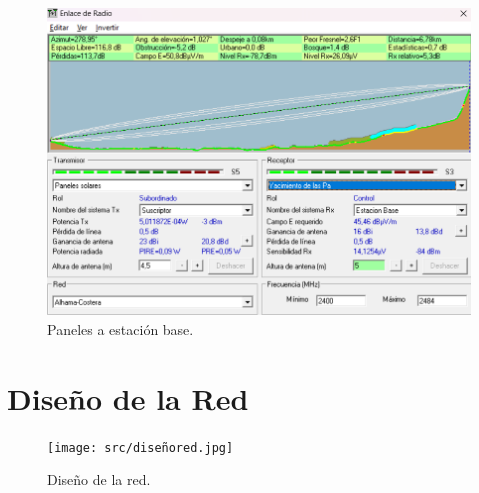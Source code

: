 \documentclass{article}
\begin{document}
\newpage
\begin{figure}[ht]
    \centering
    \includegraphics[width=0.8\linewidth]{src/Paneles-EstacionBase.png}
    \caption{\label{fig:panelesebase} Paneles a estación base.}
\end{figure}

\section{Diseño de la Red}
\begin{figure}[ht]
    \centering
    \texttt{[image: src/diseñored.jpg]}
    \caption{\label{fig:diseñored} Diseño de la red.}
\end{figure}
\end{document}

